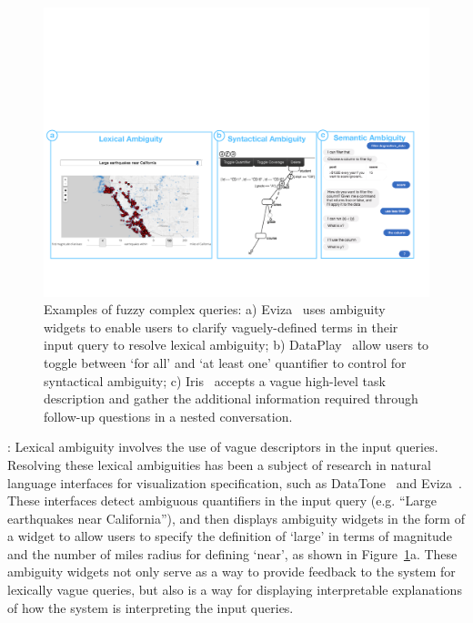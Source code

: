 \begin{figure}[h!]
\centering
\includegraphics[width=\textwidth]{figures/ambiguity.pdf}
\caption{Examples of fuzzy complex queries: a) Eviza~\cite{Setlur2016} uses ambiguity widgets to enable users to clarify vaguely-defined terms in their input query to resolve lexical ambiguity; b) DataPlay~\cite{Abouzied2012} allow users to toggle between `for all' and `at least one' quantifier to control for syntactical ambiguity; c) Iris~\cite{Fast2018} accepts a vague high-level task description and gather the additional information required through follow-up questions in a nested conversation.}
\label{fig:ambiguity}
\end{figure}
: Lexical ambiguity involves the use of vague descriptors in the input queries. Resolving these lexical ambiguities has been a subject of research in natural language interfaces for visualization specification, such as DataTone~\cite{Gao2015} and Eviza~\cite{Setlur2016}. These interfaces detect ambiguous quantifiers in the input query (e.g. ``Large earthquakes near California''), and then displays ambiguity widgets in the form of a widget to allow users to specify the definition of `large' in terms of magnitude and the number of miles radius for defining `near', as shown in Figure~\ref{fig:ambiguity}a. These ambiguity widgets not only serve as a way to provide feedback to the system for lexically vague queries, but also is a way for displaying interpretable explanations of how the system is interpreting the input queries. 
